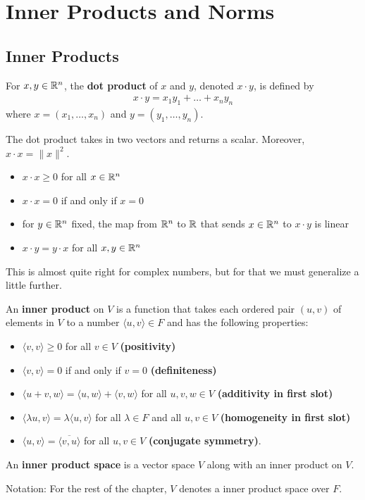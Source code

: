 \documentclass{memoir}
\begin{document}
\chapter{Inner Products and Norms}
\label{cha:inner_products_and_norms}
\section{Inner Products}
\label{sec:inner_products}

\begin{defn}
	For $x,y \in \mathbb{R}^{n}$, the \textbf{dot product} of $x$ and $y$, denoted $x\cdot y$, is defined by
	\begin{align*}
		x\cdot y = x_1y_1+\ldots+x_ny_n
	\end{align*}
	where $x = (x_1,\ldots,x_n)$ and $y = (y_1,\ldots,y_n)$.
\end{defn}
The dot product takes in two vectors and returns a scalar. Moreover, $x\cdot x = \|x\|^2$.
\begin{cor}
	\begin{itemize}
		\item $x\cdot x \geq 0$ for all $x\in \mathbb{R}^{n}$ 
		\item $x\cdot x = 0$ if and only if $x = 0$ 
		\item for $y \in \mathbb{R}^{n}$ fixed, the map from $\mathbb{R}^{n}$ to $\mathbb{R}$ that sends $x \in \mathbb{R}^{n}$ to $x\cdot y$ is linear
		\item $x\cdot y = y\cdot x$ for all $x,y \in \mathbb{R}^{n}$
	\end{itemize}
\end{cor}
This is almost quite right for complex numbers, but for that we must generalize a little further.
\begin{defn}
	An \textbf{inner product} on $V$ is a function that takes each ordered pair $(u,v)$ of elements in $V$ to a number $\langle u, v \rangle \in F$ and has the following properties:
	\begin{itemize}
		\item $ \langle v, v \rangle \geq 0 $ for all $v \in V$ \textbf{(positivity)}
		\item $ \langle v, v \rangle = 0$ if and only if $v = 0$ \textbf{(definiteness)}
		\item  $ \langle u+v, w \rangle = \langle u, w \rangle + \langle v, w \rangle $ for all $u,v,w \in V$ \textbf{(additivity in first slot)}
		\item $ \langle \lambda u, v \rangle = \lambda \langle u, v \rangle $ for all $\lambda \in F$ and all $u,v \in V$ \textbf{(homogeneity in first slot)}
		\item $ \langle u, v \rangle = \overline{ \langle v, u \rangle }$ for all $u,v \in V$ \textbf{(conjugate symmetry)}.
	\end{itemize}
\end{defn}
\begin{defn}
	An \textbf{inner product space} is a vector space $V$ along with an inner product on $V$.
\end{defn}
Notation: For the rest of the chapter, $V$ denotes a inner product space over $F$.
\end{document}
